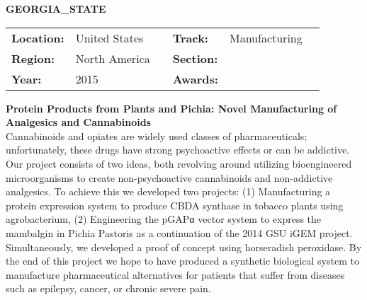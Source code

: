 \textbf{\uppercase{Georgia\_State}}
\FloatBarrier
\begin{table}[h]
\begin{tabular}{lp{2.5cm}llll}
\textbf{Location:} & United States & \multicolumn{1}{|l}{} & \textbf{Track:}   & Manufacturing \\
\textbf{Region:}   & North America   & \multicolumn{1}{|l}{} & \textbf{Section:} &  \\
\textbf{Year:}     & 2015   & \multicolumn{1}{|l}{} & \textbf{Awards:}  &
\end{tabular}
\end{table}
\FloatBarrier
\noindent	\textbf{Protein Products from Plants and Pichia: Novel Manufacturing of Analgesics and Cannabinoids} \vspace{.2cm}\\
Cannabinoids and opiates are widely used classes of pharmaceuticals; unfortunately, these drugs have strong psychoactive effects or can be addictive. Our project consists of two ideas, both revolving around utilizing bioengineered microorganisms to create non-psychoactive cannabinoids and non-addictive analgesics. To achieve this we developed two projects: (1) Manufacturing a protein expression system to produce CBDA synthase in tobacco plants using agrobacterium, (2) Engineering the pGAPα vector system to express the mambalgin in Pichia Pastoris as a continuation of the 2014 GSU iGEM project. Simultaneously, we developed a proof of concept using horseradish peroxidase. By the end of this project we hope to have produced a synthetic biological system to manufacture pharmaceutical alternatives for patients that suffer from diseases such as epilepsy, cancer, or chronic severe pain.
\vspace{2cm} $ $
\pagebreak

